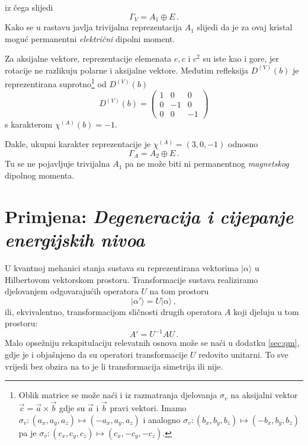 iz čega slijedi
\begin{displaymath}
   \Gamma_{V} = A_1  \oplus E \,.
\end{displaymath}
Kako se u rastavu javlja trivijalna reprezentacija $A_1$  slijedi
da je za ovaj kristal moguć permanentni \emph{električni} dipolni
moment.

Za aksijalne vektore, reprezentacije elemenata $e, c$ i $c^2$ su iste kao i
gore, jer rotacije ne razlikuju polarne i aksijalne vektore. 
Međutim refleksija $D^{(V)}(b)$ je reprezentirana
suprotno\footnote{Oblik matrice se može naći i iz razmatranja djelovanja $\sigma_{v}$ na
aksijalni vektor $\vec{c}=\vec{a}\times\vec{b}$ gdje 
su $\vec{a}$ i $\vec{b}$ pravi
vektori. Imamo $\sigma_{v}:(a_x, a_y, a_z)\mapsto (-a_x, a_y, a_z)$ i
 analogno $\sigma_{v}:(b_x, b_y, b_z)\mapsto (-b_x, b_y, b_z)$ pa je
 $\sigma_{v}:(c_x, c_y, c_z)\mapsto (c_x, -c_y, -c_z)$.} 
od $D^{(V)}(b)$
\begin{displaymath}
D^{(V)}(b)=
\begin{pmatrix}
1 & 0 & 0 \\
0 & -1 & 0 \\
0 & 0 & -1
\end{pmatrix}
\end{displaymath}
s karakterom $\chi^{(A)}(b)=-1$.

Dakle, ukupni karakter reprezentacije je $\chi^{(A)}=(3, 0, -1)$ odnosno
\begin{displaymath}
      \Gamma_{A} = A_2 \oplus E \,.
\end{displaymath}
Tu se ne pojavljuje trivijalna $A_1$ pa ne može biti ni permanentnog \emph{magnetskog}
dipolnog momenta.

\section{Primjena: \emph{Degeneracija i cijepanje energijskih nivoa}}
\label{sec:degeneracija}

U kvantnoj mehanici stanja sustava su reprezentirana vektorima
$|\alpha\rangle$ u Hilbertovom vektorskom prostoru. Transformacije
sustava realiziramo djelovanjem odgovarajućih operatora $U$ na tom prostoru
\begin{equation}
 |\alpha'\rangle = U |\alpha\rangle \,,
\end{equation}
ili, ekvivalentno, transformacijom sličnosti drugih 
operatora $A$ koji djeluju u tom prostoru:
\begin{equation}
   A' = U^{-1} A U \,.
\end{equation}
Malo opsežniju rekapitulaciju relevatnih osnova može se naći u dodatku
\ref{sec:qm}, gdje je i objašnjeno da su operatori transformacije $U$
redovito unitarni. To sve vrijedi bez obzira na to je li transformacija
simetrija ili nije.

